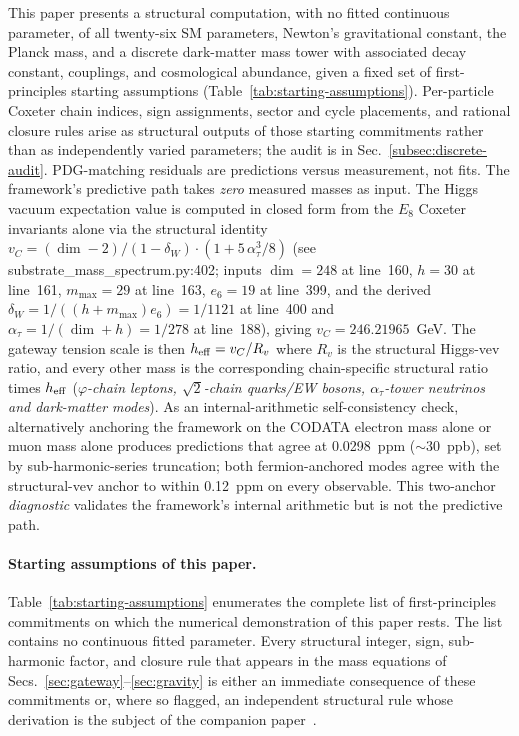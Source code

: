 ﻿\documentclass[reprint,amsmath,amssymb,aps,prd,longbibliography,floatfix]{revtex4-2}
\begin{document}
This paper presents a structural computation, with no fitted
continuous parameter, of all twenty-six SM parameters, Newton's
gravitational constant, the Planck mass, and a discrete dark-matter
mass tower with associated decay constant, couplings, and cosmological
abundance, given a fixed set of first-principles starting assumptions
(Table~\ref{tab:starting-assumptions}). Per-particle Coxeter chain
indices, sign assignments, sector and cycle placements, and rational
closure rules arise as structural outputs of those starting
commitments rather than as independently varied parameters; the
audit is in Sec.~\ref{subsec:discrete-audit}. PDG-matching residuals are
predictions versus measurement, not fits. The framework's predictive
path takes \emph{zero} measured masses as input. The Higgs vacuum
expectation value is computed in closed form from the $E_8$ Coxeter
invariants alone via the structural identity
$v_C = (\dim - 2)/(1 - \delta_W) \cdot (1 + 5\,\alpha_\tau^3/8)$
(see substrate\_mass\_spectrum.py:402; inputs $\dim=248$ at line~160,
$h=30$ at line~161, $m_{\max}=29$ at line~163, $e_6=19$ at line~399, and
the derived $\delta_W = 1/((h+m_{\max})e_6) = 1/1121$ at line~400 and
$\alpha_\tau = 1/(\dim+h) = 1/278$ at line~188), giving
$v_C = 246.21965$~GeV. The gateway tension scale is then
$h_{\rm eff} = v_C / R_v$ where $R_v$ is the structural Higgs-vev
ratio, and every other mass is the corresponding chain-specific
structural ratio times $h_{\rm eff}$ (\textit{$\varphi$-chain leptons,
$\sqrt{2}$-chain quarks/EW bosons, $\alpha_\tau$-tower neutrinos and
dark-matter modes}). As an internal-arithmetic self-consistency check,
alternatively anchoring the framework on the CODATA electron mass alone
or muon mass alone produces predictions that agree at
\SI{0.0298}{ppm} ($\sim 30$~ppb), set by sub-harmonic-series truncation;
both fermion-anchored modes agree with the structural-vev anchor to
within \SI{0.12}{ppm} on every observable. This two-anchor
\emph{diagnostic} validates the framework's internal arithmetic but is
not the predictive path.

\paragraph{Starting assumptions of this paper.}
Table~\ref{tab:starting-assumptions} enumerates the complete list of
first-principles commitments on which the numerical demonstration of
this paper rests. The list contains no continuous fitted parameter.
Every structural integer, sign, sub-harmonic factor, and closure rule
that appears in the mass equations of Secs.~\ref{sec:gateway}--\ref{sec:gravity}
is either an immediate consequence of these commitments or, where so
flagged, an independent structural rule whose derivation is the subject
of the companion paper~\cite{UnreasonableEffectiveness}.
\end{document}
